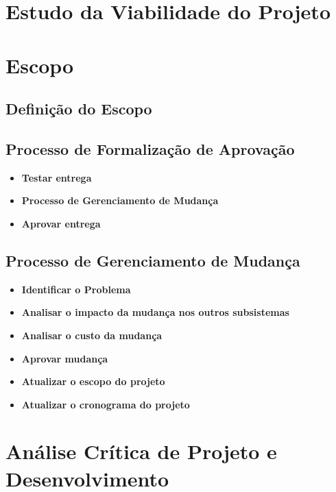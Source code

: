 \section{Estudo da Viabilidade do Projeto}

\section{Escopo}
\subsection{Definição do Escopo}

\subsection{Processo de Formalização de Aprovação}

\begin{itemize}
\item \textbf{Testar entrega}

\item \textbf{Processo de Gerenciamento de Mudança}

\item \textbf{Aprovar entrega} 
\end{itemize}

\subsection{Processo de Gerenciamento de Mudança}
 
\begin{itemize}

\item \textbf{Identificar o Problema}

\item \textbf{Analisar o impacto da mudança nos outros subsistemas}

\item \textbf{Analisar o custo da mudança}

\item\textbf{ Aprovar mudança}

\item \textbf{Atualizar o escopo do projeto}

\item \textbf{Atualizar o cronograma do projeto}

\end{itemize}

\section{Análise Crítica de Projeto e Desenvolvimento}

